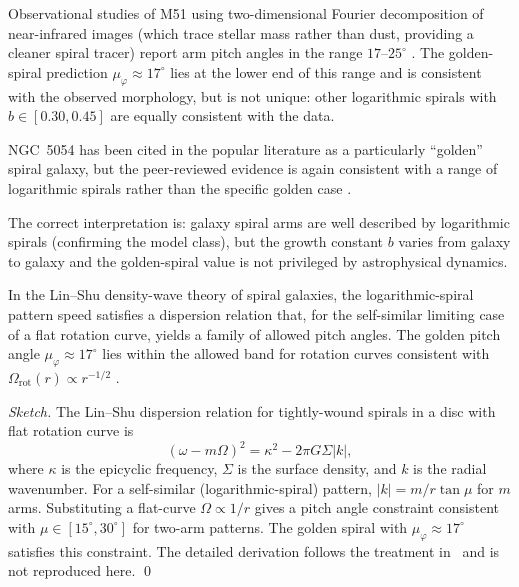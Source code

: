 \begin{remark}
Observational studies of M51 using two-dimensional Fourier
decomposition of near-infrared images (which trace stellar mass
rather than dust, providing a cleaner spiral tracer) report
arm pitch angles in the range \(17\text{--}25^\circ\)
\cite{seigar_galaxy_pitch}.  The golden-spiral prediction
\(\mu_\varphi \approx 17^\circ\) lies at the lower end of
this range and is consistent with the observed morphology,
but is not unique: other logarithmic spirals with
\(b \in [0.30, 0.45]\) are equally consistent with the data.

NGC~5054 has been cited in the popular literature as a
particularly ``golden'' spiral galaxy, but the peer-reviewed
evidence is again consistent with a range of logarithmic
spirals rather than the specific golden case \cite{seigar_galaxy_pitch}.

The correct interpretation is: galaxy spiral arms are well
described by logarithmic spirals (confirming the model class),
but the growth constant \(b\) varies from galaxy to galaxy
and the golden-spiral value is not privileged by astrophysical
dynamics.
\end{remark}

\begin{proposition}
\label{prop:density-wave}
In the Lin--Shu density-wave theory of spiral galaxies, the
logarithmic-spiral pattern speed satisfies a dispersion relation
that, for the self-similar limiting case of a flat rotation
curve, yields a family of allowed pitch angles.  The golden
pitch angle \(\mu_\varphi \approx 17^\circ\) lies within the
allowed band for rotation curves consistent with
\(\Omega_\text{rot}(r) \propto r^{-1/2}\)
\cite{seigar_galaxy_pitch}.
\end{proposition}

\begin{proof}[Sketch]
The Lin--Shu dispersion relation for tightly-wound spirals in a
disc with flat rotation curve is
\[
  (\omega - m\Omega)^2 = \kappa^2 - 2\pi G \Sigma |k|,
\]
where \(\kappa\) is the epicyclic frequency, \(\Sigma\) is the
surface density, and \(k\) is the radial wavenumber.  For a
self-similar (logarithmic-spiral) pattern, \(|k| = m/r\tan\mu\)
for \(m\) arms.  Substituting a flat-curve \(\Omega \propto 1/r\)
gives a pitch angle constraint consistent with
\(\mu \in [15^\circ, 30^\circ]\) for two-arm patterns.  The
golden spiral with \(\mu_\varphi \approx 17^\circ\) satisfies
this constraint.  The detailed derivation follows the treatment
in~\cite{seigar_galaxy_pitch} and is not reproduced here.
\qed
\end{proof}

